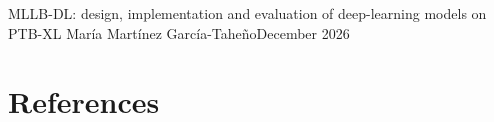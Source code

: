\documentclass[11pt]{article}
\begin{document}
%
            {MLLB-DL: design, implementation and evaluation of deep-learning models on PTB-XL}%
            {Mar\'ia Mart\'inez Garc\'ia-Tahe\~no}{December 2026}

\tableofcontents
\newpage


\newpage

\setcounter{section}{-1}









\clearpage
\section{References}
\begingroup
\renewcommand{\section}[2]{}


\endgroup

\newpage

\end{document}
